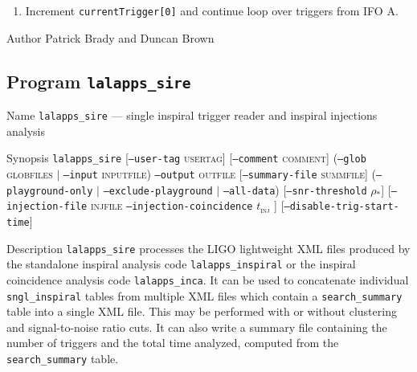 \begin{entry}
\begin{enumerate}
\begin{enumerate}
\item Increment \texttt{currentTrigger[0]} and continue loop over triggers
from IFO A.
\end{enumerate}
\end{enumerate}

\item[Author] 
Patrick Brady and Duncan Brown
\end{entry}


\clearpage
\subsection{Program \texttt{lalapps\_sire}}
\label{program:lalapps-sire}

\begin{entry}
\item[Name]
\verb$lalapps_sire$ --- single inspiral trigger reader and inspiral injections
analysis

\item[Synopsis]
\verb$lalapps_sire$  \newline
%
[\texttt{--user-tag} \textsc{usertag}] 
[\texttt{--comment} \textsc{comment}] \newline
%
(\texttt{--glob} \textsc{globfiles} $|$ \texttt{--input} \textsc{inputfile})
\texttt{--output} \textsc{outfile}
[\texttt{--summary-file} \textsc{summfile}] \newline
%
(\texttt{--playground-only} $|$ 
\texttt{--exclude-playground} $|$
\texttt{--all-data})\newline
%
[\texttt{--snr-threshold} \textsc{$\rho_\ast$}]\newline
%
[\texttt{--injection-file} \textsc{injfile} 
\texttt{--injection-coincidence} \textsc{$t_\mathrm{inj}$}\newline
{}
] \newline
%
[\texttt{--disable-trig-start-time}]

\item[Description] 
\verb$lalapps_sire$ processes the LIGO lightweight XML files produced by the
standalone inspiral analysis code \verb$lalapps_inspiral$ or the inspiral
coincidence analysis code \verb$lalapps_inca$. It can be used to concatenate
individual \verb$sngl_inspiral$ tables from multiple XML files which contain a
\verb$search_summary$ table into a single XML file. This may be performed with
or without clustering and signal-to-noise ratio cuts. It can also write a
summary file containing the number of triggers and the total time analyzed,
computed from the \verb$search_summary$ table.


\end{entry}
